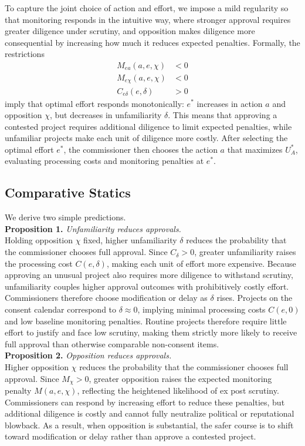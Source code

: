 To capture the joint choice of action and effort, we impose a mild regularity so that monitoring responds in the intuitive way, where stronger approval requires greater diligence under scrutiny, and opposition makes diligence more consequential by increasing how much it reduces expected penalties. Formally, the restrictions
\[
\begin{aligned}
M_{ea}(a,e,\chi) &< 0 \\
M_{e\chi}(a,e,\chi) &< 0 \\
C_{e\delta}(e,\delta) &> 0
\end{aligned}
\]
imply that optimal effort responds monotonically: $e^*$ increases in action $a$ and opposition $\chi$, but decreases in unfamiliarity $\delta$. This means that approving a contested project requires additional diligence to limit expected penalties, while unfamiliar projects make each unit of diligence more costly. After selecting the optimal effort $e^*$, the commissioner then chooses the action $a$ that maximizes $U_A^*$, evaluating processing costs and monitoring penalties at $e^*$.

\subsection{Comparative Statics}

We derive two simple predictions.\\

\textbf{Proposition 1.} \textit{Unfamiliarity reduces approvals.}\\

Holding opposition $\chi$ fixed, higher unfamiliarity $\delta$ reduces the probability that the commissioner chooses full approval. Since $C_\delta > 0$, greater unfamiliarity raises the processing cost $C(e,\delta)$, making each unit of effort more expensive. Because approving an unusual project also requires more diligence to withstand scrutiny, unfamiliarity couples higher approval outcomes with prohibitively costly effort. Commissioners therefore choose modification or delay as $\delta$ rises. Projects on the consent calendar correspond to $\delta \approx 0$, implying minimal processing costs $C(e,0)$ and low baseline monitoring penalties. Routine projects therefore require little effort to justify and face low scrutiny, making them strictly more likely to receive full approval than otherwise comparable non-consent items.\\

\textbf{Proposition 2.} \textit{Opposition reduces approvals.}\\

Higher opposition $\chi$ reduces the probability that the commissioner chooses full approval. Since $M_\chi > 0$, greater opposition raises the expected monitoring penalty $M(a,e,\chi)$, reflecting the heightened likelihood of ex post scrutiny. Commissioners can respond by increasing effort to reduce these penalties, but additional diligence is costly and cannot fully neutralize political or reputational blowback. As a result, when opposition is substantial, the safer course is to shift toward modification or delay rather than approve a contested project.\\

